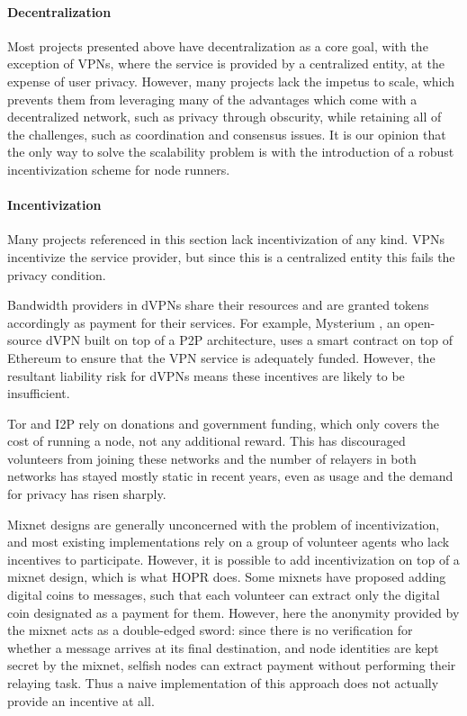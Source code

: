 \paragraph{Decentralization} Most projects presented above have decentralization as a core goal, with the exception of VPNs, where the service is provided by a centralized entity, at the expense of user privacy. However, many projects lack the impetus to scale, which prevents them from leveraging many of the advantages which come with a decentralized network, such as privacy through obscurity, while retaining all of the challenges, such as coordination and consensus issues. It is our opinion that the only way to solve the scalability problem is with the introduction of a robust incentivization scheme for node runners.

\paragraph{Incentivization} Many projects referenced in this section lack incentivization of any kind. VPNs incentivize the service provider, but since this is a centralized entity this fails the privacy condition.

Bandwidth providers in dVPNs share their resources and are granted tokens accordingly as payment for their services. For example, Mysterium \cite{mysterium}, an open-source dVPN built on top of a P2P architecture, uses a smart contract on top of Ethereum to ensure that the VPN service is adequately funded. However, the resultant liability risk for dVPNs means these incentives are likely to be insufficient.

Tor and I2P rely on donations and government funding, which only covers the cost of running a node, not any additional reward. This has discouraged volunteers from joining these networks and the number of relayers in both networks has stayed mostly static in recent years, even as usage and the demand for privacy has risen sharply.

Mixnet designs are generally unconcerned with the problem of incentivization, and most existing implementations rely on a group of volunteer agents who lack incentives to participate. However, it is possible to add incentivization on top of a mixnet design, which is what HOPR does. Some mixnets have proposed adding digital coins to messages, such that each volunteer can extract only the digital coin designated as a payment for them. However, here the anonymity provided by the mixnet acts as a double-edged sword: since there is no verification for whether a message arrives at its final destination, and node identities are kept secret by the mixnet, selfish nodes can extract payment without performing their relaying task. Thus a naive implementation of this approach does not actually provide an incentive at all.

